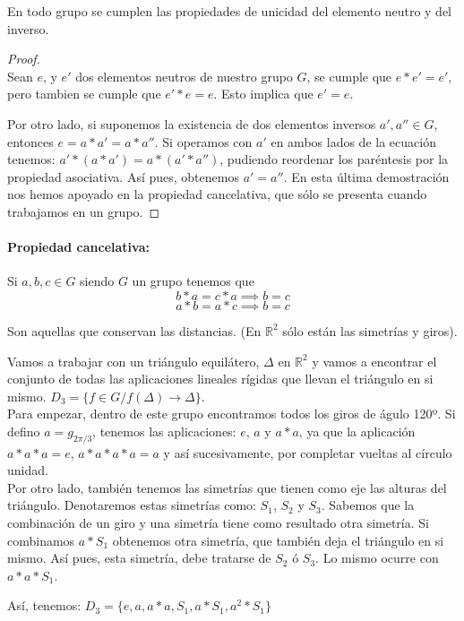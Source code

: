 \documentclass[a4paper,10pt]{apuntes}
\begin{document}
\begin{theorem}
	En todo grupo se cumplen las propiedades de unicidad del elemento neutro y del inverso.  
\end{theorem} 

 \begin{proof}
 \\Sean $e$, y $e'$ dos elementos neutros de nuestro grupo $G$, se cumple que $e*e'=e'$, pero tambien se cumple que $e'*e=e$. Esto implica que $e'=e$.

 Por otro lado, si suponemos la existencia de dos elementos inversos $a',a''\in G$, entonces $e=a*a'=a*a''$. Si operamos con $a'$ en ambos lados de la ecuación tenemos: $a'*(a*a')=a*(a'*a'')$, pudiendo reordenar los paréntesis por la propiedad asociativa. Así pues, obtenemos $a'=a''$.
 En esta última demostración nos hemos apoyado en la propiedad cancelativa, que sólo se presenta cuando trabajamos en un grupo.
 \end{proof}
 
 \paragraph{Propiedad cancelativa:}
 Si $a,b,c\in G$ siendo $G$ un grupo tenemos que $$b\ast a = c\ast a \implies b = c$$ $$a\ast b = a\ast c \implies b = c$$
  
 \begin{defn}
  Son aquellas que conservan las distancias. (En $\mathbb{R}^{2}$  sólo están las simetrías y giros).
 \end{defn}
 
 \begin{example} 
  Vamos a trabajar con un triángulo equilátero, $\Delta$  en $\mathbb{R}^{2}$  y vamos a encontrar el conjunto de todas las aplicaciones lineales rígidas 
  que llevan el triángulo en si mismo. $D_{3}=\{f\in G / f(\Delta)\longrightarrow\Delta\}$.\\
  Para empezar, dentro de este grupo encontramos todos los giros de águlo 120º. Si defino $a=g_{2\pi/3}$, tenemos las aplicaciones:
  $e$, $a$  y $a*a$, ya que la aplicación $a*a*a=e$, $a*a*a*a=a$  y así sucesivamente, por completar vueltas al círculo unidad.\\
  Por otro lado, también tenemos las simetrías que tienen como eje las alturas del triángulo. Denotaremos estas simetrías como: $S_{1}$, $S_{2}$  y $S_{3}$.
  Sabemos que la combinación de un giro y una simetría tiene como resultado otra simetría. Si combinamos $a*S_{1}$  obtenemos otra simetría, 
  que también deja el triángulo en si mismo. Así pues, esta simetría, debe tratarse de $S_{2}$  ó $S_{3}$. Lo mismo ocurre con $a*a*S_{1}$.
  
  Así, tenemos: $D_{3}=\{e, a, a*a, S_{1}, a*S_{1}, a^{2}*S_{1}\}$
 \end{example}
\end{document}
